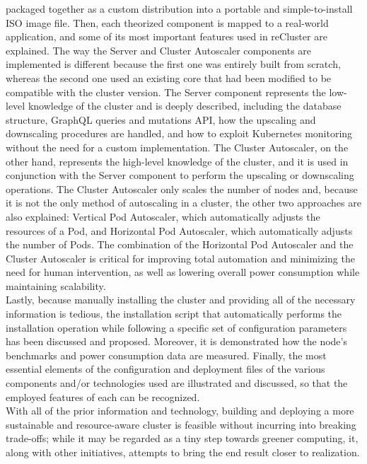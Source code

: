packaged together as a custom distribution into a portable and simple-to-install
ISO image file. Then, each theorized component is mapped to a real-world
application, and some of its most important features used in reCluster are explained.
The way the Server and Cluster Autoscaler components are implemented is
different because the first one was entirely built from scratch, whereas the second
one used an existing core that had been modified to be compatible with the cluster
version. The Server component represents the low-level knowledge of the cluster
and is deeply described, including the database structure, GraphQL queries and
mutations API, how the upscaling and downscaling procedures are handled, and how
to exploit Kubernetes monitoring without the need for a custom implementation. The
Cluster Autoscaler, on the other hand, represents the high-level knowledge of the
cluster, and it is used in conjunction with the Server component to perform the
upscaling or downscaling operations. The Cluster Autoscaler only scales the number
of nodes and, because it is not the only method of autoscaling in a cluster, the
other two approaches are also explained: Vertical Pod Autoscaler, which automatically
adjusts the resources of a Pod, and Horizontal Pod Autoscaler, which automatically
adjusts the number of Pods. The combination of the Horizontal Pod Autoscaler and
the Cluster Autoscaler is critical for improving total automation and minimizing
the need for human intervention, as well as lowering overall power consumption while
maintaining scalability. \\ %
Lastly, because manually installing the cluster and providing all of the
necessary information is tedious, the installation script that automatically performs
the installation operation while following a specific set of configuration parameters
has been discussed and proposed. Moreover, it is demonstrated how the node's benchmarks
and power consumption data are measured. Finally, the most essential elements of
the configuration and deployment files of the various components and/or technologies
used are illustrated and discussed, so that the employed features of each can be
recognized. \\ %
With all of the prior information and technology, building and deploying a more sustainable
and resource-aware cluster is feasible without incurring into breaking trade-offs;
while it may be regarded as a tiny step towards greener computing, it, along
with other initiatives, attempts to bring the end result closer to realization.

